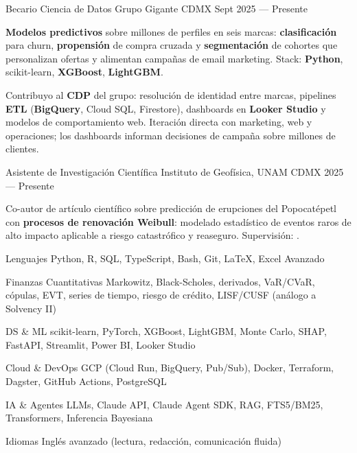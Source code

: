 \documentclass[10pt, letterpaper]{awesome-cv}
\begin{document}
\begin{cventries}

  \cventry
    {Becario Ciencia de Datos}
    {Grupo Gigante}
    {CDMX}
    {Sept 2025 — Presente}
    {
      \begin{cvitems}
        \item {\textbf{Modelos predictivos} sobre millones de perfiles en seis marcas: \textbf{clasificación} para churn, \textbf{propensión} de compra cruzada y \textbf{segmentación} de cohortes que personalizan ofertas y alimentan campañas de email marketing. Stack: \textbf{Python}, scikit-learn, \textbf{XGBoost}, \textbf{LightGBM}.}
        \item {Contribuyo al \textbf{CDP} del grupo: resolución de identidad entre marcas, pipelines \textbf{ETL} (\textbf{BigQuery}, Cloud SQL, Firestore), dashboards en \textbf{Looker Studio} y modelos de comportamiento web. Iteración directa con marketing, web y operaciones; los dashboards informan decisiones de campaña sobre millones de clientes.}
      \end{cvitems}
    }

  \cventry
    {Asistente de Investigación Científica }
    {Instituto de Geofísica, UNAM}
    {CDMX}
    {2025 — Presente}
    {
      \begin{cvitems}
        \item {Co-autor de artículo científico sobre predicción de erupciones del Popocatépetl con \textbf{procesos de renovación Weibull}: modelado estadístico de eventos raros de alto impacto aplicable a riesgo catastrófico y reaseguro. Supervisión: .}
      \end{cvitems}
    }

\end{cventries}


\begin{cvskills}
  \cvskill
    {Lenguajes}
    {Python, R, SQL, TypeScript, Bash, Git, \LaTeX, Excel Avanzado}

  \cvskill
    {Finanzas Cuantitativas}
    {Markowitz, Black-Scholes, derivados, VaR/CVaR, cópulas, EVT, series de tiempo, riesgo de crédito, LISF/CUSF (análogo a Solvency II)}

  \cvskill
    {DS \& ML}
    {scikit-learn, PyTorch, XGBoost, LightGBM, Monte Carlo, SHAP, FastAPI, Streamlit, Power BI, Looker Studio}

  \cvskill
    {Cloud \& DevOps}
    {GCP (Cloud Run, BigQuery, Pub/Sub), Docker, Terraform, Dagster, GitHub Actions, PostgreSQL}

  \cvskill
    {IA \& Agentes}
    {LLMs, Claude API, Claude Agent SDK, RAG, FTS5/BM25, Transformers, Inferencia Bayesiana}

  \cvskill
    {Idiomas}
    {Inglés avanzado (lectura, redacción, comunicación fluida)}
\end{cvskills}
\end{document}
